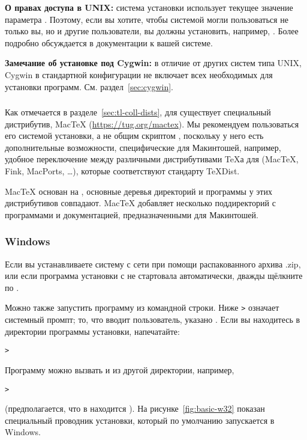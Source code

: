 \documentclass{article}
\begin{document}
\textbf{О правах доступа в UNIX:} система установки
\TL{} использует текущее значение параметра .  Поэтому,
если вы хотите, чтобы системой могли пользоваться не только вы, но и
другие пользователи, вы должны установить, например, .  Более подробно  обсуждается в документации к
вашей системе.

\textbf{Замечание об установке под Cygwin:} в отличие от других
систем типа UNIX, Cygwin в стандартной конфигурации не включает всех
необходимых для установки \TL{} программ.
См. раздел~\ref{sec:cygwin}. 

\subsubsection{\MacOSX}
\label{sec:macosx}

Как отмечается в разделе~\ref{sec:tl-coll-dists}, для \MacOSX{}
существует специальный дистрибутив, Mac\TeX{}
(\url{https://tug.org/mactex}). Мы рекомендуем пользоваться его
системой установки, а не общим скриптом \TL{}, поскольку у него есть
дополнительные возможности, специфические для Макинтошей, например,
удобное переключение между различными дистрибутивами \TeX а для
\MacOSX{} (Mac\TeX, Fink, MacPorts, \ldots), которые соответствуют
стандарту \TeX{}Dist.

Mac\TeX{} основан на \TL{}, основные деревья директорий и программы у
этих дистрибутивов совпадают.  Mac\TeX{} добавляет несколько
поддиректорий с программами и документацией, предназначенными для
Макинтошей.

\subsubsection{Windows}\label{sec:wininst}

Если вы устанавливаете систему с сети при помощи распакованного архива
.zip, или если программа установки с
\DVD{} не стартовала автоматически, дважды щёлкните по
.

Можно также запустить программу из командной строки.  Ниже \texttt{>}
означает системный промпт;  то, что вводит пользователь, указано
.  Если вы находитесь в директории
программы установки, напечатайте:
\begin{alltt}
> 
\end{alltt}

Программу можно вызвать и из другой директории, например, 
\begin{alltt}
> 
\end{alltt}
(предполагается, что в  находится \DVD{} \TK{}).  На
рисунке~\ref{fig:basic-w32} показан специальный проводник установки,
который по умолчанию запускается в Windows.
\end{document}
